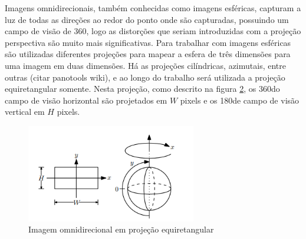 \documentclass[cic,tc]{iiufrgs}
\begin{document}
\begin{figure}
\begin{center}
{
	}
    \end{center}
    \label{fig:perspectiveProj}
\end{figure}

Imagens omnidirecionais, também conhecidas como imagens esféricas, capturam a luz de todas as direções ao redor do ponto onde são capturadas, possuindo um campo de visão de 360\degree, logo as distorções que seriam introduzidas com a projeção perspectiva são muito mais significativas. Para trabalhar com imagens esféricas são utilizadas diferentes projeções para mapear a esfera de três dimensões para uma imagem em duas dimensões. Há as projeções cilíndricas, azimutais, entre outras (citar panotools wiki), e ao longo do trabalho será utilizada a projeção equiretangular somente. Nesta projeção,  como descrito na figura \ref{fig:sphericalIm}, os 360\degree do campo de visão horizontal são projetados em $W$ pixels e os 180\degree de campo de visão vertical em $H$ pixels.

\begin{figure}
    \caption{Imagem omnidirecional em projeção equiretangular}
    \begin{center}
        \includegraphics[width=20em]{equiretangular.png}
    \end{center}
    \label{fig:sphericalIm}
\end{figure}
\end{document}
